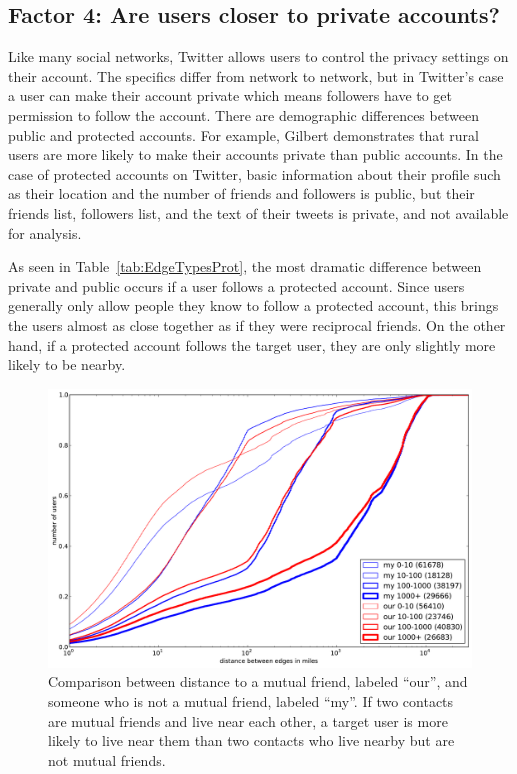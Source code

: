 \documentclass[letterpaper]{article}
\begin{document}
\subsection{Factor 4: Are users closer to private accounts?}

Like many social networks, Twitter allows users to control the privacy settings
on their account.
%
The specifics differ from network to network, but in Twitter's case
a user can make their account private which means followers have to get
permission to follow the account.
%
There are demographic differences between public and protected accounts.
%
For example, Gilbert \cite{gilbert2008network} demonstrates that rural users
are more likely to make their accounts private than public accounts.
%
In the case of protected accounts on Twitter, basic information
about their profile such as their location and the number of friends and
followers is public, but their friends list, followers list, and the text of
their tweets is private, and not available for analysis.

As seen in Table~\ref{tab:EdgeTypesProt}, the most dramatic difference between
private and public occurs if a user follows a protected account.
%
Since users generally only allow people they know to follow a protected
account, this brings the users almost as close together as if they were
reciprocal friends.
%
On the other hand, if a protected account follows the target user, they
are only slightly more likely to be nearby.

\begin{figure}[tbh]
\centering
\includegraphics[width=\linewidth]{figures/near_triads.pdf}
\caption{
Comparison between distance to a mutual friend, labeled ``our'', and someone
who is not a mutual friend, labeled ``my''.
If two contacts are mutual friends and live near each other, a target user is
more likely to live near them than two contacts who live nearby but are not
mutual friends.
}
\label{fig:NearTriads}
\end{figure}
\end{document}
